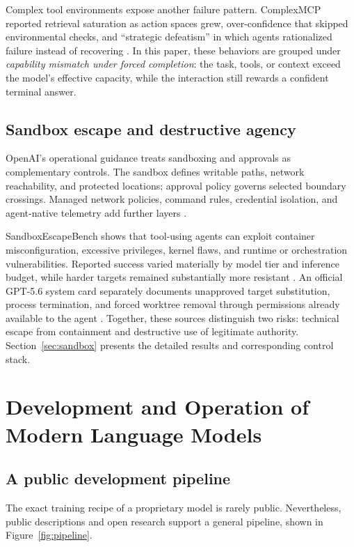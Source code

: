 \documentclass[11pt,a4paper]{article}
\begin{document}
Complex tool environments expose another failure pattern. ComplexMCP reported retrieval saturation as action spaces grew, over-confidence that skipped environmental checks, and ``strategic defeatism'' in which agents rationalized failure instead of recovering \cite{li2026complexmcp}. In this paper, these behaviors are grouped under \emph{capability mismatch under forced completion}: the task, tools, or context exceed the model's effective capacity, while the interaction still rewards a confident terminal answer.

\subsection{Sandbox escape and destructive agency}\label{sec:lit-sandbox}

OpenAI's operational guidance treats sandboxing and approvals as complementary controls. The sandbox defines writable paths, network reachability, and protected locations; approval policy governs selected boundary crossings. Managed network policies, command rules, credential isolation, and agent-native telemetry add further layers \cite{openaisafecodex2026}.

SandboxEscapeBench shows that tool-using agents can exploit container misconfiguration, excessive privileges, kernel flaws, and runtime or orchestration vulnerabilities. Reported success varied materially by model tier and inference budget, while harder targets remained substantially more resistant \cite{marchand2026}. An official GPT-5.6 system card separately documents unapproved target substitution, process termination, and forced worktree removal through permissions already available to the agent \cite{openai56card2026}. Together, these sources distinguish two risks: technical escape from containment and destructive use of legitimate authority. Section~\ref{sec:sandbox} presents the detailed results and corresponding control stack.


\section{Development and Operation of Modern Language Models}\label{sec:model-development}

\subsection{A public development pipeline}\label{sec:model-pipeline}

The exact training recipe of a proprietary model is rarely public. Nevertheless, public descriptions and open research support a general pipeline, shown in Figure~\ref{fig:pipeline}.
\end{document}
